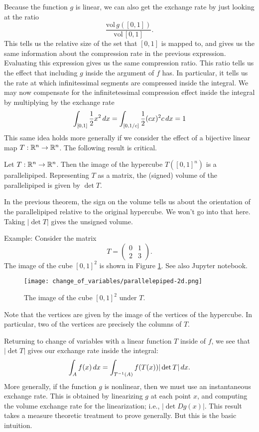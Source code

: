 Because the function $g$ is linear, we can also get the exchange rate by just looking at the ratio
$$
\frac{\mbox{vol} \, g([0, 1])}{\mbox{vol}\, [0,1]}.
$$
This tells us the relative size of the set that $[0,1]$ is mapped to, and gives us the same information about the compression rate in the previous expression. Evaluating this expression gives us the same compression ratio. This ratio tells us the effect that including $g$ inside the argument of $f$ has. In particular, it tells us the rate at which infinitessimal segments are compressed inside the integral. We may now compensate for the infinitetessimal compression effect inside the integral by multiplying by the exchange rate
$$
\int_{[0,1]} \frac{1}{2} x^2 \, dx = \int_{[0,1/c]} \frac{1}{2} (cx)^2  c\, dx = 1
$$
This same idea holds more generally if we consider the effect of a bijective linear map $T:\mathbb{R}^n\to\mathbb{R}^n$. The following result is critical. 
\begin{theorem}
Let $T:\mathbb{R}^n\to\mathbb{R}^n$. Then the image of the hypercube $T([0, 1]^n)$ is a parallelipiped. Representing $T$ as a matrix, the (signed) volume of the parallelipiped is given by $\det T$. 
\end{theorem}
In the previous theorem, the sign on the volume tells us about the orientation of the parallelipiped relative to the original hypercube. We won't go into that here. Taking $|\det T|$ gives the unsigned volume. 

\vspace{1em}
Example: Consider the matrix
$$
T = 
\begin{pmatrix}
0 & 1\\
2 & 3
\end{pmatrix}. 
$$
The image of the cube $[0,1]^2$ is shown in Figure \ref{fig:parallelepiped-2d}. See also Jupyter notebook. 
\begin{figure}[h] \label{fig:parallelepiped-2d}
\centering
\texttt{[image: change\_of\_variables/parallelepiped-2d.png]}
\caption{The image of the cube $[0,1]^2$ under $T$.}
\end{figure}

Note that the vertices are given by the image of the vertices of the hypercube. In particular, two of the vertices are precisely the columns of $T$. 

Returning to change of variables with a linear function $T$ inside of $f$, we see that $|\det T|$ gives our exchange rate inside the integral:
$$
\int_A f(x)\, dx = \int_{T^{-1}(A)} f(T(x)) |\det T| \, dx.
$$
More generally, if the function $g$ is nonlinear, then we must use an instantaneous exchange rate. This is obtained by linearizing $g$ at each point $x$, and computing the volume exchange rate for the linearization; i.e., $|\det Dg(x)|$. 
This result takes a measure theoretic treatment to prove generally. But this is the basic intuition. 

